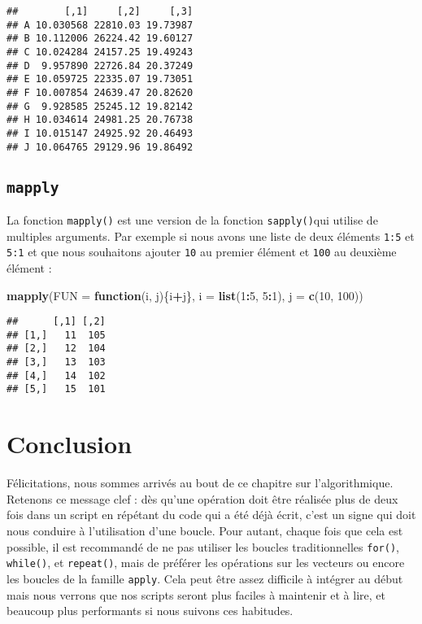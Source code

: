 \documentclass[]{book}
\newenvironment{Shaded}{\begin{snugshade}}{\end{snugshade}}
\newcommand{\KeywordTok}[1]{\textcolor[rgb]{0.13,0.29,0.53}{\textbf{#1}}}
\newcommand{\DataTypeTok}[1]{\textcolor[rgb]{0.13,0.29,0.53}{#1}}
\newcommand{\DecValTok}[1]{\textcolor[rgb]{0.00,0.00,0.81}{#1}}
\newcommand{\ControlFlowTok}[1]{\textcolor[rgb]{0.13,0.29,0.53}{\textbf{#1}}}
\newcommand{\OperatorTok}[1]{\textcolor[rgb]{0.81,0.36,0.00}{\textbf{#1}}}
\newcommand{\NormalTok}[1]{#1}
\theoremstyle{definition}
\theoremstyle{definition}
\theoremstyle{definition}
\theoremstyle{remark}
\begin{document}
\begin{verbatim}
##        [,1]     [,2]     [,3]
## A 10.030568 22810.03 19.73987
## B 10.112006 26224.42 19.60127
## C 10.024284 24157.25 19.49243
## D  9.957890 22726.84 20.37249
## E 10.059725 22335.07 19.73051
## F 10.007854 24639.47 20.82620
## G  9.928585 25245.12 19.82142
## H 10.034614 24981.25 20.76738
## I 10.015147 24925.92 20.46493
## J 10.064765 29129.96 19.86492
\end{verbatim}

\subsection{\texorpdfstring{\texttt{mapply}}{mapply}}\label{l17mapply}

La fonction \texttt{mapply()} est une version de la fonction
\texttt{sapply()}qui utilise de multiples arguments. Par exemple si nous
avons une liste de deux éléments \texttt{1:5} et \texttt{5:1} et que
nous souhaitons ajouter \texttt{10} au premier élément et \texttt{100}
au deuxième élément :

\begin{Shaded}
\begin{Highlighting}[]
\KeywordTok{mapply}\NormalTok{(}\DataTypeTok{FUN =} \ControlFlowTok{function}\NormalTok{(i, j)\{i}\OperatorTok{+}\NormalTok{j\}, }\DataTypeTok{i =} \KeywordTok{list}\NormalTok{(}\DecValTok{1}\OperatorTok{:}\DecValTok{5}\NormalTok{, }\DecValTok{5}\OperatorTok{:}\DecValTok{1}\NormalTok{), }\DataTypeTok{j =} \KeywordTok{c}\NormalTok{(}\DecValTok{10}\NormalTok{, }\DecValTok{100}\NormalTok{))}
\end{Highlighting}
\end{Shaded}

\begin{verbatim}
##      [,1] [,2]
## [1,]   11  105
## [2,]   12  104
## [3,]   13  103
## [4,]   14  102
## [5,]   15  101
\end{verbatim}

\section{Conclusion}\label{conclusion-6}

Félicitations, nous sommes arrivés au bout de ce chapitre sur
l'algorithmique. Retenons ce message clef : dès qu'une opération doit
être réalisée plus de deux fois dans un script en répétant du code qui a
été déjà écrit, c'est un signe qui doit nous conduire à l'utilisation
d'une boucle. Pour autant, chaque fois que cela est possible, il est
recommandé de ne pas utiliser les boucles traditionnelles
\texttt{for()}, \texttt{while()}, et \texttt{repeat()}, mais de préférer
les opérations sur les vecteurs ou encore les boucles de la famille
\texttt{apply}. Cela peut être assez difficile à intégrer au début mais
nous verrons que nos scripts seront plus faciles à maintenir et à lire,
et beaucoup plus performants si nous suivons ces habitudes.
\end{document}

